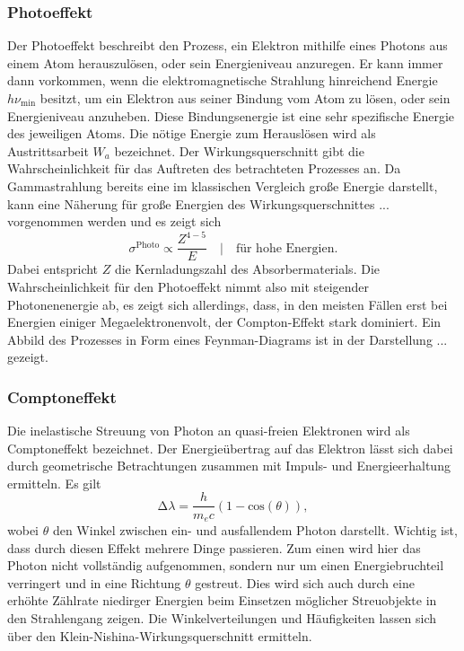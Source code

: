 \subsubsection{Photoeffekt}
Der Photoeffekt beschreibt den Prozess, ein Elektron mithilfe eines Photons aus einem Atom herauszulösen, oder sein Energieniveau anzuregen. 
Er kann immer dann vorkommen, wenn die elektromagnetische Strahlung hinreichend Energie $h\nu_{\text{min}}$ besitzt, um ein Elektron aus seiner Bindung vom Atom zu lösen, oder sein Energieniveau anzuheben. 
Diese Bindungsenergie ist eine sehr spezifische Energie des jeweiligen Atoms. Die nötige Energie zum Herauslösen wird als Austrittsarbeit $W_a$ bezeichnet. 
Der Wirkungsquerschnitt gibt die Wahrscheinlichkeit für das Auftreten des betrachteten Prozesses an.
Da Gammastrahlung bereits eine im klassischen Vergleich große Energie darstellt, kann eine Näherung für große Energien des Wirkungsquerschnittes ... vorgenommen werden und es zeigt sich
\begin{equation}
\sigma^{\text{Photo}} \propto \frac{Z^{4-5}}{E} \quad | \quad \text{für hohe Energien}.
\end{equation}
Dabei entspricht $Z$ die Kernladungszahl des Absorbermaterials. 
Die Wahrscheinlichkeit für den Photoeffekt nimmt also mit steigender Photonenenergie ab, es zeigt sich allerdings, dass, in den meisten Fällen erst bei Energien einiger Megaelektronenvolt, der Compton-Effekt stark dominiert. 
Ein Abbild des Prozesses in Form eines Feynman-Diagrams ist in der Darstellung ... gezeigt.
\subsubsection{Comptoneffekt}
Die inelastische Streuung von Photon an quasi-freien Elektronen wird als Comptoneffekt bezeichnet. 
Der Energieübertrag auf das Elektron lässt sich dabei durch geometrische Betrachtungen zusammen mit Impuls- und Energieerhaltung ermitteln. Es gilt
\begin{equation}
    \increment \lambda = \frac{h}{m_e c} (1 - \text{cos}(\theta)),
\end{equation}
wobei $\theta$ den Winkel zwischen ein- und ausfallendem Photon darstellt. 
Wichtig ist, dass durch diesen Effekt mehrere Dinge passieren. Zum einen wird hier das Photon nicht vollständig aufgenommen, sondern nur um einen Energiebruchteil verringert und in eine Richtung $\theta$ gestreut. 
Dies wird sich auch durch eine erhöhte Zählrate niedirger Energien beim Einsetzen möglicher Streuobjekte in den Strahlengang zeigen. Die Winkelverteilungen und Häufigkeiten lassen sich über den Klein-Nishina-Wirkungsquerschnitt ermitteln. 

